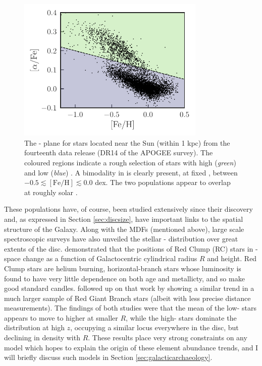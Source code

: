 \begin{figure}
    \centering
    \includegraphics[width=0.8\textwidth]{thesis/Plots/afe_split_colors.pdf}
    \caption[The \feh{} and \afe{} abundances of stars in the solar vicinity from APOGEE DR14, indicating the bimodality in \afe{} at fixed \feh{}]{The \feh{}-\afe{} plane for stars located near the Sun (within 1 kpc) from the fourteenth data release (DR14 of the APOGEE survey). The coloured regions indicate a rough selection of stars with high (\emph{green}) and low (\emph{blue}) \afe{}. A bimodality in \afe{} is clearly present, at fixed \feh{}, between $-0.5 \lesssim \mathrm{[Fe/H]} \lesssim 0.0$ dex. The two populations appear to overlap at roughly solar \feh{}.}
    \label{fig:afe_split}
\end{figure}

These populations have, of course, been studied extensively since their discovery \citep[e.g.][]{1998A&A...338..161F,2003A&A...410..527B,2005A&A...433..185B,2013A&A...560A.109H,2014A&A...562A..71B,2014A&A...564A.115A,2014ApJ...796...38N,2015ApJ...808..132H} and, as expressed in Section \ref{sec:discsize}, have important links to the spatial structure of the Galaxy. Along with the MDFs (mentioned above), large scale spectroscopic surveys have also unveiled the stellar \feh{}-\afe{} distribution over great extents of the disc.  \citet{2014ApJ...796...38N} demonstrated that the positions of Red Clump (RC) stars in \feh{}-\afe{} space change as a function of Galactocentric cylindrical radius $R$ and height. Red Clump stars are helium burning, horizontal-branch stars whose luminosity is found to have very little dependence on both age and metallicty, and so make good standard candles. \citet{2015ApJ...808..132H} followed up on that work by showing a similar trend in a much larger sample of Red Giant Branch stars (albeit with less precise distance measurements). The findings of both studies were that the mean \feh{} of the low-\afe{} stars appears to move to higher \feh{} at smaller $R$, while the high-\afe{} stars dominate the distribution at high $z$, occupying a similar locus everywhere in the disc, but declining in density with $R$. These results place very strong constraints on any model which hopes to explain the origin of these element abundance trends, and I will briefly discuss such models in Section \ref{sec:galacticarchaeology}.

